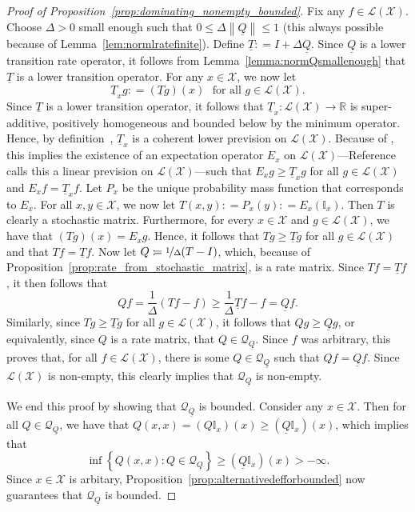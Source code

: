 \documentclass[10pt]{paper}
\theoremstyle{definition}
\newcommand{\reals}{\mathbb{R}}
\newcommand{\states}{\mathcal{X}}
\newcommand{\lt}{\underline{T}}
\newcommand{\gambles}{\mathcal{L}}
\newcommand{\gamblesX}{\gambles(\states)}
\newcommand{\ind}[1]{\mathbb{I}_{#1}}
\newcommand{\rateset}{\mathcal{Q}}
\newcommand{\lrate}{\underline{Q}}
\newcommand{\norm}[1]{\left\lVert #1 \right\rVert}
\newcommand{\coloneqq}{:\!=}
\begin{document}
\begin{proof}[Proof of Proposition~\ref{prop:dominating_nonempty_bounded}]
Fix any $f\in\gamblesX$. Choose $\Delta>0$ small enough such that $0\leq\Delta\norm{\lrate}\leq 1$ (this always possible because of Lemma~\ref{lem:normlratefinite}). Define $\lt\coloneqq I+\Delta\lrate$. Since $\lrate$ is a lower transition rate operator, it follows from Lemma~\ref{lemma:normQsmallenough} that $\lt$ is a lower transition operator. For any $x\in\states$, we now let
\begin{equation*}
\lt_xg\coloneqq(\lt g)(x)
\text{~~for all $g\in\gamblesX$.}
\end{equation*}
Since $\lt$ is a lower transition operator, it follows that $\lt_x\colon \gamblesX\to\reals$ is super-additive, positively homogeneous and bounded below by the minimum operator. Hence, by definition~\cite[Definition~2.3.3]{Walley:1991vk}, $\lt_x$ is a coherent lower prevision on $\gamblesX$. Because of \cite[Theorem~3.3.3(b)]{Walley:1991vk}, this implies the existence of an expectation operator $E_x$ on $\gamblesX$---Reference~\cite{Walley:1991vk} calls this a linear prevision on $\gamblesX$---such that $E_xg\geq\lt_xg$ for all $g\in\gamblesX$ and $E_xf=\lt_xf$. Let $P_x$ be the unique probability mass function that corresponds to $E_x$. For all $x,y\in\states$, we now let $T(x,y)\coloneqq P_x(y)\coloneqq E_x(\ind{x})$. Then $T$ is clearly a stochastic matrix. Furthermore, for every $x\in\states$ and $g\in\gamblesX$, we have that $(Tg)(x)=E_xg$. Hence, it follows that $Tg\geq\lt g$ for all $g\in\gamblesX$ and that $Tf=\lt f$. Now let $Q\coloneqq\nicefrac{1}{\Delta}(T-I)$, which, because of Proposition~\ref{prop:rate_from_stochastic_matrix}, is a rate matrix. Since $Tf=\lt f$, it then follows that
\begin{equation*}
Qf=\frac{1}{\Delta}(Tf-f)\geq\frac{1}{\Delta}{\lt f-f}=\lrate f.
\end{equation*}
Similarly, since $Tg\geq\lt g$ for all $g\in\gamblesX$, it follows that $Qg\geq\lrate g$, or equivalently, since $Q$ is a rate matrix, that $Q\in\rateset_{\lrate}$. Since $f$ was arbitrary, this proves that, for all $f\in\gamblesX$, there is some $Q\in\rateset_{\lrate}$ such that $Qf=\lrate f$. Since $\gamblesX$ is non-empty, this clearly implies that $\rateset_{\lrate}$ is non-empty.

We end this proof by showing that $\rateset_{\lrate}$ is bounded. Consider any $x\in\states$. Then for all $Q\in\rateset_{\lrate}$, we have that $Q(x,x)=(Q\ind{x})(x)\geq(\lrate\ind{x})(x)$, which implies that
\begin{equation*}
\inf\left\{Q(x,x)\colon Q\in\rateset_{\lrate}\right\}\geq(\lrate\ind{x})(x)>-\infty.
\end{equation*}
Since $x\in\states$ is arbitary, Proposition~\ref{prop:alternativedefforbounded} now guarantees that $\rateset_{\lrate}$ is bounded. 
\end{proof}
\end{document}
